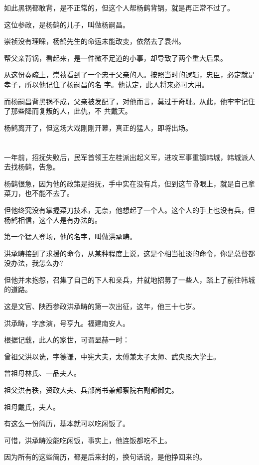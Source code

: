 \documentclass[11pt,a4paper,onecolumn]{article}
\begin{document}
如此黑锅都敢背，是不正常的，但这个人帮杨鹤背锅，就是再正常不过了。

这位参政，是杨鹤的儿子，叫做杨嗣昌。

崇祯没有理睬，杨鹤先生的命运未能改变，依然去了袁州。

帮父亲背锅，看起来，是一件微不足道的小事，却导致了两个重大后果。

从这份奏疏上，崇祯看到了一个忠于父亲的人。按照当时的逻辑，忠臣，必定就是孝子，所以他记住了杨嗣昌的名
字。他认定，此人将来必可大用。

而杨嗣昌背黑锅不成，父亲被发配了，对他而言，莫过于奇耻。从此，他牢牢记住了那些降而复叛的人，此仇，不
共戴天。

杨鹤离开了，但这场大戏刚刚开幕，真正的猛人，即将出场。

\section[\thesection]{}

一年前，招抚失败后，民军首领王左桂派出起义军，进攻军事重镇韩城，韩城派人去找杨鹤，告急。

杨鹤很急，因为他的政策是招抚，手中实在没有兵，但到这节骨眼上，就是自己拿菜刀，也不能不去了。

但他终究没有掌握菜刀技术，无奈，他想起了一个人。这个人的手上也没有兵，但杨鹤相信，这个人是有办法的。

第一个猛人登场，他的名字，叫做洪承畴。

洪承畴接到了求援的命令，从某种程度上说，这是个相当扯淡的命令，你是总督都没办法，我怎么办?

但他并未抱怨，召集了自己的下人和亲兵，并就地招募了一些人，踏上了前往韩城的道路。

这是文官、陕西参政洪承畴的第一次出征，这年，他三十七岁。

洪承畴，字彦演，号亨九。福建南安人。

根据记载，此人的家世，可谓显赫一时：

曾祖父洪以诜，字德谦，中宪大夫，太傅兼太子太师、武央殿大学士。

曾祖母林氏、一品夫人。

祖父洪有秩，资政大夫、兵部尚书兼都察院右副都御史。

祖母戴氏，夫人。

有这么一份简历，基本就可以吃闲饭了。

可惜，洪承畴没能吃闲饭，事实上，他连饭都吃不上。

因为所有的这些简历，都是后来封的，换句话说，是他挣回来的。
\end{document}
